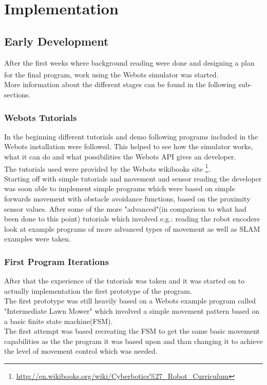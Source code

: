\chapter{Implementation}
\label{Implementation}

\section{Early Development}
After the first weeks where background reading were done and designing a plan for the final program, work using the Webots\textsuperscript{\texttrademark} simulator was started. \\ More information about the different stages can be found in the following sub-sections.

\subsection{Webots Tutorials}
In the beginning different tutorials and demo following  programs included in the Webots installation were followed.
This helped to see how the simulator works, what it can do and what possibilities the Webots API gives an developer. \\
The tutorials used were provided by the Webots wikibooks site \footnote{\url{http://en.wikibooks.org/wiki/Cyberbotics\%27_Robot_Curriculum}}.\\
Starting off with simple tutorials and movement and sensor reading the developer was soon able to implement simple programs which were based on simple forwards movement with obstacle avoidance functions, based on the proximity sensor values.
After some of the more "advanced"(in comparison to what had been done to this point) tutorials which involved e.g.: reading the robot encoders look at example programs of more advanced types of movement as well as SLAM examples were taken. \\

\subsection{First Program Iterations}
After that the experience of the tutorials was taken and it was started on to actually implementation the first prototype of the program. \\
The first prototype was still heavily based on a Webots example program called "Intermediate Lawn Mower" which involved a simple movement pattern based on a basic finite state machine(FSM). \\
The first attempt was based recreating the FSM to get the same basic movement capabilities as the the program it was based upon and than changing it to achieve the level of movement control which was needed. \\[3ex]

